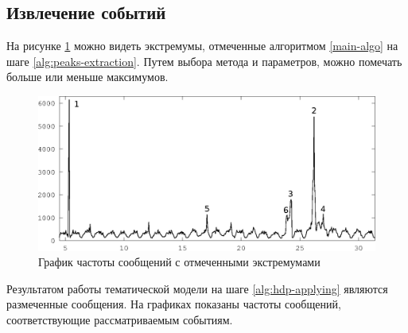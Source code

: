 \documentclass[12pt, a4paper]{article}
\begin{document}
  \subsection{Извлечение событий}
  
	На рисунке \ref{fig:all-freq-labeled} можно видеть экстремумы, отмеченные алгоритмом \ref{main-algo} на шаге \ref{alg:peaks-extraction}. Путем выбора метода и параметров, можно помечать больше или меньше максимумов. 

	 \begin{figure}[H]
	  \centering
	  \includegraphics[width=14cm]{all-freq-labeled-1.eps}
	  \caption{График частоты сообщений с отмеченными экстремумами}
	  \label{fig:all-freq-labeled}
	  \end{figure}
	  
	  Результатом работы тематической модели на шаге \ref{alg:hdp-applying} являются размеченные сообщения. На графиках показаны частоты сообщений, соответствующие рассматриваемым событиям.
	  
\end{document}
